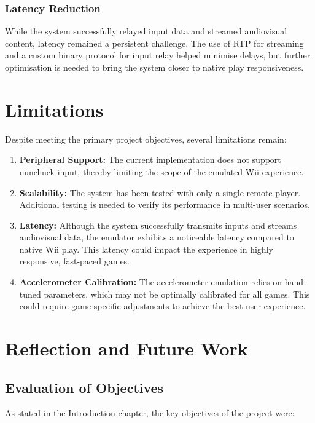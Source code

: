 \subsubsection{Latency Reduction}
While the system successfully relayed input data and streamed audiovisual content, latency remained a persistent challenge. The use of RTP for streaming and a custom binary protocol for input relay helped minimise delays, but further optimisation is needed to bring the system closer to native play responsiveness.

\section{Limitations}

Despite meeting the primary project objectives, several limitations remain:

\begin{enumerate}
	\item \textbf{Peripheral Support:}
	      The current implementation does not support nunchuck input, thereby limiting the scope of the emulated Wii experience.
	\item \textbf{Scalability:}
	      The system has been tested with only a single remote player. Additional testing is needed to verify its performance in multi-user scenarios.
	\item \textbf{Latency:}
	      Although the system successfully transmits inputs and streams audiovisual data, the emulator exhibits a noticeable latency compared to native Wii play. This latency could impact the experience in highly responsive, fast-paced games.
	\item \textbf{Accelerometer Calibration:}
	      The accelerometer emulation relies on hand-tuned parameters, which may not be optimally calibrated for all games. This could require game-specific adjustments to achieve the best user experience.
\end{enumerate}

\section{Reflection and Future Work}

\subsection{Evaluation of Objectives}
As stated in the \hyperlink{chapter:introduction}{Introduction} chapter, the key objectives of the project were:

